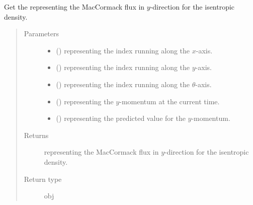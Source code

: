 \documentclass[letterpaper,10pt,english]{sphinxmanual}
\begin{document}
\begin{fulllineitems}
\begin{fulllineitems}
\label{\detokenize{api:dycore.flux_isentropic_maccormack.FluxIsentropicMacCormack._get_maccormack_flux_y_s}}
Get the  representing the MacCormack flux in \(y\)-direction
for the isentropic density.
\begin{quote}\begin{description}
\item[{Parameters}] \leavevmode\begin{itemize}
\item {} 
 () \textendash{}  representing the index running along the \(x\)-axis.

\item {} 
 () \textendash{}  representing the index running along the \(y\)-axis.

\item {} 
 () \textendash{}  representing the index running along the \(\theta\)-axis.

\item {} 
 () \textendash{}  representing the \(y\)-momentum at the current time.

\item {} 
 () \textendash{}  representing the predicted value for the \(y\)-momentum.

\end{itemize}

\item[{Returns}] \leavevmode
{} representing the MacCormack flux in \(y\)-direction for the isentropic density.

\item[{Return type}] \leavevmode
obj

\end{description}\end{quote}

\end{fulllineitems}


\end{fulllineitems}
\end{document}
